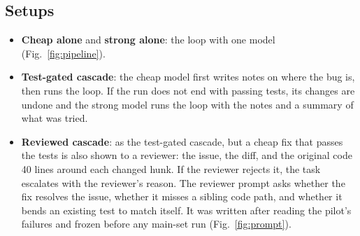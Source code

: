 \documentclass[10pt,conference]{IEEEtran}
\begin{document}
\subsection{Setups}
\begin{itemize}
\item \textbf{Cheap alone} and \textbf{strong alone}: the loop with one model (Fig.~\ref{fig:pipeline}).
\item \textbf{Test-gated cascade}: the cheap model first writes notes on where the bug is, then runs the loop. If the
run does not end with passing tests, its changes are undone and the strong model runs the loop with the notes and a
summary of what was tried.
\item \textbf{Reviewed cascade}: as the test-gated cascade, but a cheap fix that passes the tests is also shown to a
reviewer: the issue, the diff, and the original code 40 lines around each changed hunk. If the reviewer rejects it,
the task escalates with the reviewer's reason. The reviewer prompt asks whether the fix resolves the issue, whether it
misses a sibling code path, and whether it bends an existing test to match itself. It was written after reading the
pilot's failures and frozen before any main-set run (Fig.~\ref{fig:prompt}).
\end{itemize}
\end{document}
